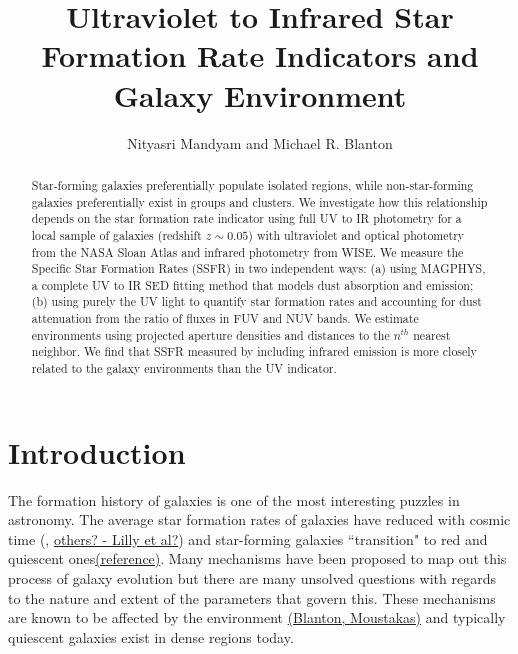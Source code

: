 \documentclass[iop]{emulateapj}
\begin{document}
\title{Ultraviolet to Infrared Star Formation Rate Indicators and Galaxy Environment}
\author{Nityasri Mandyam and Michael R. Blanton}
\begin{abstract}
Star-forming galaxies preferentially populate isolated regions, while non-star-forming galaxies preferentially exist in groups and clusters. We investigate how this relationship depends on the star formation rate indicator using full UV to IR photometry for a local sample of galaxies (redshift $z \sim 0.05$) with ultraviolet and optical photometry from the NASA Sloan Atlas and infrared photometry from WISE. We measure the Specific Star Formation Rates (SSFR) in two independent ways: (a) using MAGPHYS, a complete UV to IR SED fitting method that models dust absorption and emission; (b) using purely the UV light to quantify star formation rates and accounting for dust attenuation from the ratio of fluxes in FUV and NUV bands. We estimate environments using projected aperture densities and distances to the $n^{th}$ nearest neighbor. We find that SSFR measured by including infrared emission is more closely related to the galaxy environments than the UV indicator.
\end{abstract}

\section{Introduction}


The formation history of galaxies is one of the most interesting puzzles in astronomy. The average star formation rates of galaxies have reduced with cosmic time (\citet{Mad98}, \underline{others? - Lilly et al?}) and star-forming galaxies ``transition" to red and quiescent ones\underline{(reference)}. Many mechanisms have been proposed to map out this process of galaxy evolution but there are many unsolved questions with regards to the nature and extent of the parameters that govern this. These mechanisms are known to be affected by the environment \underline{(Blanton, Moustakas)} and typically quiescent galaxies exist in dense regions today.\\
\end{document}
